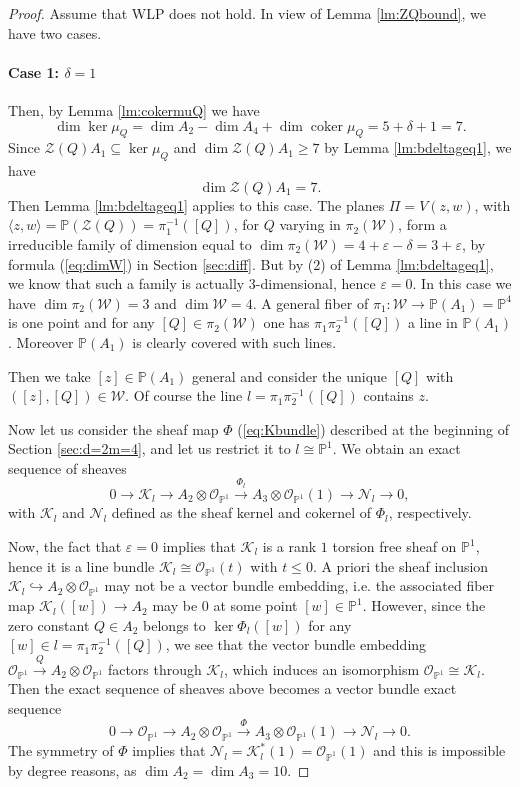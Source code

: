 \documentclass[10pt, a4paper]{amsart}
\theoremstyle{plain}
\theoremstyle{definition}
\theoremstyle{remark}
\def\OO{\mathcal{O}}
\def\PP{\mathbb{P}}
\begin{document}
\begin{proof}
Assume that WLP does not hold. In view of Lemma \ref{lm:ZQbound}, we have two cases.
\vskip2mm
\paragraph{\bf Case 1: $\delta= 1$} Then, by Lemma \ref{lm:cokermuQ} we have $$\dim\ker\mu_Q=\dim A_2-\dim A_4+\dim\operatorname{coker}\mu_Q=5+\delta+1=7.$$ Since $\mathcal{Z}(Q)A_1\subseteq \ker\mu_Q$ and $\dim \mathcal{Z}(Q)A_1\geq 7$ by Lemma \ref{lm:bdeltageq1}, we have $$\dim \mathcal{Z}(Q)A_1=7.$$ 
Then Lemma \ref{lm:bdeltageq1} applies to this case.  The planes $\Pi=V(z,w)$, with $\langle z,w\rangle=\PP(\mathcal{Z}(Q))=\pi_1^{-1}([Q])$, for $Q$ varying in $\pi_2(\mathcal{W})$, form a irreducible family of dimension  equal to $\dim\pi_2(\mathcal{W})=4+\varepsilon-\delta=3+\varepsilon$, by formula (\ref{eq:dimW}) in Section \ref{sec:diff}. But by (2) of Lemma \ref{lm:bdeltageq1}, we know that such a family is actually $3$-dimensional, hence $\varepsilon=0$.
In this case we have  $\dim\pi_2(\mathcal{W})=3$ and $\dim\mathcal{W}=4$. A general fiber of $\pi_1:\mathcal{W}\to \PP(A_1)=\PP^4$ is one point and for any $[Q]\in\pi_2(\mathcal{W})$ one has $\pi_1\pi_2^{-1}([Q])$ a line in $\PP(A_1)$. Moreover $\PP(A_1)$ is clearly covered with such lines. 

Then we take $[z]\in \PP(A_1)$ general and consider the unique $[Q]$ with $([z],[Q])\in \mathcal{W}$. Of course the line $l=\pi_1\pi_2^{-1}([Q])$ contains  $z$. 

Now let us consider the sheaf map $\Phi$ (\ref{eq:Kbundle}) described at the beginning of Section \ref{sec:d=2m=4}, and let us restrict it to $l\cong \PP^1$. 
We obtain an exact sequence of sheaves
$$0\to\mathcal{K}_l\to A_2\otimes\OO_{\PP^1}\stackrel{\Phi_l}\longrightarrow A_3\otimes\OO_{\PP^1}(1)\longrightarrow \mathcal{N}_l\to 0,$$
with $\mathcal{K}_l$ and $\mathcal{N}_l$ defined as the sheaf kernel and cokernel of $\Phi_l$, respectively. 

Now, the fact that $\varepsilon=0$ implies that $\mathcal{K}_l$ is a rank $1$ torsion free sheaf on $\PP^1$, hence  it is a line bundle $\mathcal{K}_l\cong \OO_{\PP^1}(t)$ with $t\leq 0$. A priori the sheaf inclusion $\mathcal{K}_l\hookrightarrow A_2\otimes\OO_{\PP^1}$ may not be a vector bundle embedding, i.e. the associated fiber map $\mathcal{K}_l([w])\to A_2$ may be $0$ at some point $[w]\in \PP^1$. However, since the zero constant $Q\in A_2$ belongs to $\ker\Phi_l([w])$ for any $[w]\in l=\pi_1\pi_2^{-1}([Q])$, we see that the vector bundle embedding $\OO_{\PP^1}\stackrel{Q}\longrightarrow A_2\otimes \OO_{\PP^1}$ factors through $\mathcal{K}_l$, which induces an isomorphism $\OO_{\PP^1}\cong \mathcal{K}_l$.
Then the exact sequence of sheaves above becomes a  vector bundle exact sequence 
$$0\to\OO_{\PP^1}\to A_2\otimes\OO_{\PP^1}\stackrel{\Phi}\longrightarrow A_3\otimes\OO_{\PP^1}(1)\longrightarrow \mathcal{N}_l\to 0.$$
The symmetry of $\Phi$ implies that $\mathcal{N}_l=\mathcal{K}_l^\ast(1)=\OO_{\PP^1}(1)$ and this is impossible by degree reasons, as $\dim A_2=\dim A_3=10$.
\vskip2mm

\end{proof}
\end{document}
